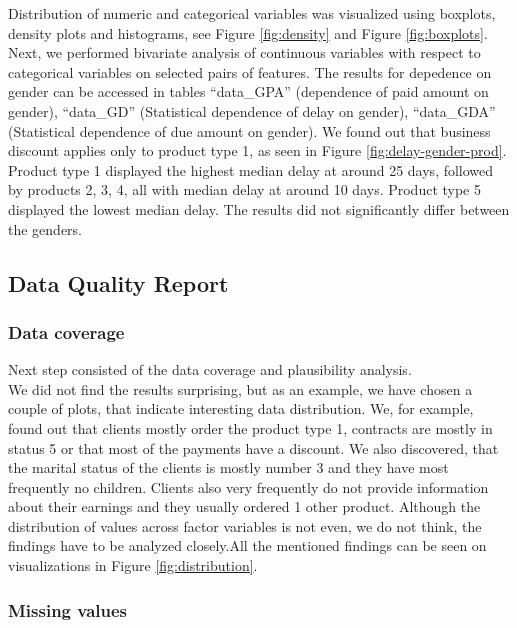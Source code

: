 \documentclass[
]{article}
\begin{document}
Distribution of numeric and categorical variables was visualized using boxplots, density plots and histograms, see Figure \ref{fig:density} and Figure \ref{fig:boxplots}. Next, we performed bivariate analysis of continuous variables with respect to categorical variables on selected pairs of features. The results for depedence on gender can be accessed in tables ``data\_GPA'' (dependence of paid amount on gender), ``data\_GD'' (Statistical dependence of delay on gender), ``data\_GDA'' (Statistical dependence of due amount on gender). We found out that business discount applies only to product type 1, as seen in Figure \ref{fig:delay-gender-prod}. Product type 1 displayed the highest median delay at around 25 days, followed by products 2, 3, 4, all with median delay at around 10 days. Product type 5 displayed the lowest median delay. The results did not significantly differ between the genders.

\hypertarget{data-quality-report}{%
\subsection{Data Quality Report}\label{data-quality-report}}

\hypertarget{data-coverage}{%
\subsubsection{Data coverage}\label{data-coverage}}

Next step consisted of the data coverage and plausibility analysis.\\
We did not find the results surprising, but as an example, we have chosen a couple of plots, that indicate interesting data distribution. We, for example, found out that clients mostly order the product type 1, contracts are mostly in status 5 or that most of the payments have a discount. We also discovered, that the marital status of the clients is mostly number 3 and they have most frequently no children. Clients also very frequently do not provide information about their earnings and they usually ordered 1 other product. Although the distribution of values across factor variables is not even, we do not think, the findings have to be analyzed closely.All the mentioned findings can be seen on visualizations in Figure \ref{fig:distribution}.

\hypertarget{missing-values}{%
\subsubsection{Missing values}\label{missing-values}}
\end{document}
